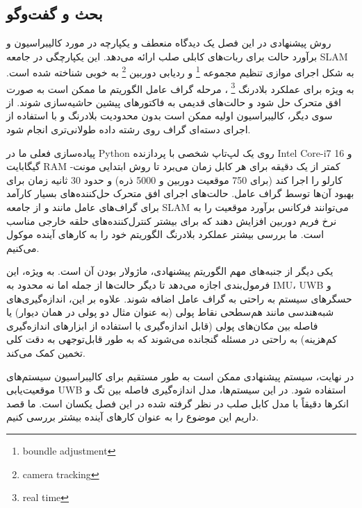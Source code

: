 \subsection{بحث و گفت‌وگو}
روش پیشنهادی در این فصل یک دیدگاه منعطف و یکپارچه در مورد کالیبراسیون و برآورد حالت برای ربات‌های کابلی صلب ارائه می‌دهد. این یکپارچگی در جامعه SLAM به شکل اجرای موازی تنظیم مجموعه
\footnote{boundle adjustment}
 و ردیابی دوربین 
\footnote{camera tracking}
 به خوبی شناخته شده است. به ویژه برای عملکرد بلادرنگ
\footnote{real time}
 ، مرحله گراف عامل الگوریتم ما ممکن است به صورت افق متحرک حل شود و حالت‌های قدیمی به فاکتورهای پیشین حاشیه‌سازی شوند. از سوی دیگر، کالیبراسیون اولیه ممکن است بدون محدودیت بلادرنگ و با استفاده از اجرای دسته‌ای گراف روی رشته داده طولانی‌تری انجام شود.

پیاده‌سازی فعلی ما در Python روی یک لپ‌تاپ شخصی با پردازنده Intel Core-i7 و 16 گیگابایت RAM کمتر از یک دقیقه برای هر کابل زمان می‌برد تا روش ابتدایی مونت-کارلو را اجرا کند (برای 750 موقعیت دوربین و 5000 ذره) و حدود 30 ثانیه زمان برای بهبود آن‌ها توسط گراف عامل. حالت‌های اجرای افق متحرک حل‌کننده‌های بسیار کارآمد برای گراف‌های عامل مانند 
\cite{dellaert2012factor} و \cite{martiros2022symforce}
 از جامعه SLAM می‌توانند فرکانس برآورد موقعیت را به نرخ فریم دوربین افزایش دهند که برای بیشتر کنترل‌کننده‌های حلقه خارجی مناسب است. ما بررسی بیشتر عملکرد بلادرنگ الگوریتم خود را به کارهای آینده موکول می‌کنیم.

یکی دیگر از جنبه‌های مهم الگوریتم پیشنهادی، ماژولار بودن آن است. به ویژه، این فرمول‌بندی اجازه می‌دهد تا دیگر حالت‌ها از جمله اما نه محدود به IMU، UWB و حسگرهای سیستم به راحتی به گراف عامل اضافه شوند. علاوه بر این، اندازه‌گیری‌های شبه‌هندسی مانند هم‌سطحی نقاط پولی (به عنوان مثال دو پولی در همان دیوار) یا فاصله بین مکان‌های پولی (قابل اندازه‌گیری با استفاده از ابزارهای اندازه‌گیری کم‌هزینه) به راحتی در مسئله گنجانده می‌شوند که به طور قابل‌توجهی به دقت کلی تخمین کمک می‌کند.

در نهایت، سیستم پیشنهادی ممکن است به طور مستقیم برای کالیبراسیون سیستم‌های موقعیت‌یابی UWB استفاده شود. در این سیستم‌ها، مدل اندازه‌گیری فاصله بین تگ و انکرها دقیقاً با مدل کابل صلب در نظر گرفته شده در این فصل یکسان است. ما قصد داریم این موضوع را به عنوان کارهای آینده بیشتر بررسی کنیم.




